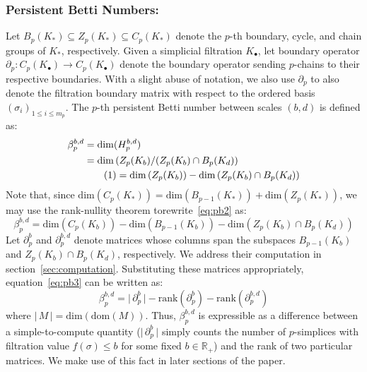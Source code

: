 \documentclass[10pt]{article}
\newcommand\numberthis{\addtocounter{equation}{1}\tag{\theequation}}
\begin{document}
\subsubsection*{Persistent Betti Numbers:} 
Let $B_p(K_\ast) \subseteq Z_p(K_\ast) \subseteq C_p(K_\ast)$ denote the $p$-th boundary, cycle, and chain groups of $K_\ast$, respectively. 
Given a simplicial filtration $K_{\bullet}$, let boundary operator $\partial_p : C_p( K_{\bullet}) \to C_p(K_{\bullet})$ denote the boundary operator sending $p$-chains to their respective boundaries. 
With a slight abuse of notation, we also use $\partial_p$ to also denote the filtration boundary matrix with respect to the ordered basis $(\sigma_i)_{1 \leq i \leq m_p}$.  
The $p$-th persistent Betti number between scales $(b,d)$ is defined as: 
\begin{align*}
	\beta_p^{b,d} &= \mathrm{dim}(H_p^{b,d}) \\
	&= \mathrm{dim} \left( Z_p(K_b) / (Z_p(K_b) \cap B_p(K_d) \right) \\
	& \numberthis = \mathrm{dim} \left( Z_p(K_b) \right) - \mathrm{dim}\left( Z_p(K_b) \cap B_p(K_d) \right ) \label{eq:pb2}
\end{align*}
Note that, since $\mathrm{dim}(C_p(K_\ast)) = \mathrm{dim}(B_{p-1}(K_\ast)) + \mathrm{dim}(Z_p(K_\ast))$, we may use the rank-nullity theorem torewrite~\eqref{eq:pb2} as:
\begin{equation} \label{eq:pb3}
\beta_p^{b,d} = \mathrm{dim} \left( C_p(K_b) \right) - \mathrm{dim} \left( B_{p-1}(K_b) \right) - \mathrm{dim}\left( Z_p(K_b) \cap B_p(K_d) \right )  
\end{equation}
Let $\partial_p^{b}$ and $\partial_p^{b, d}$ denote matrices whose columns span the subspaces $B_{p-1}(K_b)$ and $Z_p(K_b) \cap B_p(K_d)$, respectively. We address their computation in section~\eqref{sec:computation}. Substituting these matrices appropriately, equation~\eqref{eq:pb3} can be written as: 
\begin{equation}\label{eq:pb_rank}
	\beta_p^{b,d} = \lvert \, \partial_p^b \, \rvert - \mathrm{rank}(\partial_p^b) - \mathrm{rank}(\partial_p^{b,d}) 
\end{equation}
where $\lvert \, M \, \rvert = \mathrm{dim}(\mathrm{dom}(M))$. Thus, $\beta_p^{b,d}$ is expressible as a difference between a simple-to-compute quantity ($\lvert \, \partial_p^b \, \rvert$ simply counts the number of $p$-simplices with filtration value $f(\sigma) \leq b$ for some fixed $b \in \mathbb{R}_+$) and the rank of two particular matrices. We make use of this fact in later sections of the paper. 
\end{document}
